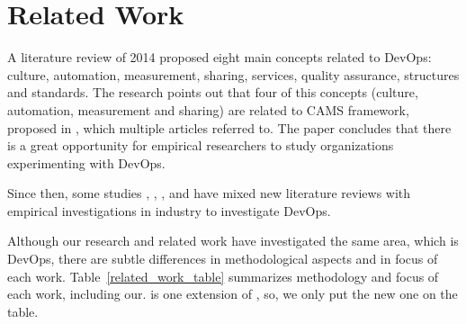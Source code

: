 \section{Related Work} \label{sec:related_work}

A literature review of 2014 \cite{cooperation_dev_ops_esem_2014} proposed eight
main concepts related to DevOps: culture, automation, measurement, sharing,
services, quality assurance, structures and standards. The research points out
that four of this concepts (culture, automation, measurement and sharing) are
related to CAMS framework, proposed in \cite{what_devops_means_2010}, which
multiple articles referred to. The paper concludes that there is a great
opportunity for empirical researchers to study organizations experimenting with
DevOps.

Since then, some studies \cite{devops_a_definition_xp_15},
\cite{dimensions_of_devops_xp_15}, \cite{extending_dimensions_icsea_16},
\cite{characterizing_devops_sbes_2016} and
\cite{qualitative_devops_journalsw_17} have mixed new literature reviews
with empirical investigations in industry to investigate DevOps.

Although our research and related work have investigated the same area, which
is DevOps, there are subtle differences in methodological aspects and in focus
of each work. Table~\ref{related_work_table} summarizes methodology and focus
of each work, including our. \cite{extending_dimensions_icsea_16} is one
extension of \cite{dimensions_of_devops_xp_15}, so, we only put the new one
on the table.

